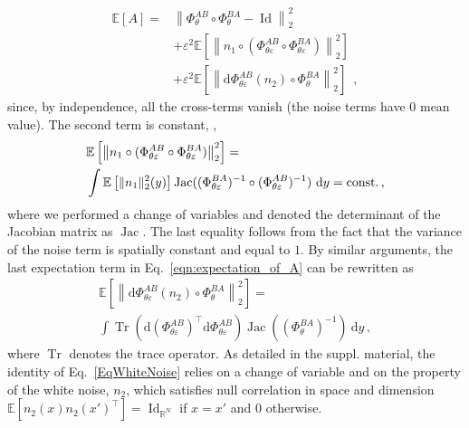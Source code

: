 \documentclass[10pt,twocolumn,letterpaper]{article} %
\newcommand{\fxpsi}{\Phi_{\theta}^{BA}}
\newcommand{\fxvarphi}{\Phi_{\theta}^{AB}}
\newcommand{\fxpsivarepsilon}{\Phi_{\theta \varepsilon}^{BA}}
\newcommand{\fxvarphivarepsilon}{\Phi_{\theta \varepsilon}^{AB}}
\begin{document}
\begin{equation}
  \begin{split}
   \mathbb{E}[A] = & \left\| \fxvarphi \circ \fxpsi - \operatorname{Id} \right\|^2_2  \\
   & + \varepsilon^2 \mathbb{E}\left[\left\|n_1\circ(\fxvarphivarepsilon \circ \fxpsivarepsilon)\right\|^2_2\right] \\ 
   & + \varepsilon^2\mathbb{E}\left[\left\|\mathrm{d}\fxvarphivarepsilon( n_2) \circ \fxpsi \right\|^2_2\right]\enspace,
  \end{split}
  \label{eqn:expectation_of_A}
\end{equation}
since, by independence, all the cross-terms vanish (the noise terms have $0$ mean value).
The second term is constant, \ie,
\begin{alignat}{1}
  &\mathbb{E}\left[\left\|n_1\circ(\fxvarphivarepsilon \circ \fxpsivarepsilon)\right\|^2_2\right] =
  \\
  &\int \mathbb{E}\left[\|n_1\|^2_2(y)\right] \operatorname{Jac}((\fxpsivarepsilon)^{-1} \circ (\fxvarphivarepsilon)^{-1})~\mathrm{d}y= \text{const.} \,, \notag
\end{alignat}
where we performed a change of variables and denoted the determinant of the Jacobian matrix as $\operatorname{Jac}$. The last equality follows from the fact that the variance of the noise term is spatially constant and equal to $1$. %
By similar arguments, the last expectation term in Eq.~\eqref{eqn:expectation_of_A} can be rewritten as
\begin{multline}\label{EqWhiteNoise}
  \mathbb{E}\left[\left\|\mathrm{d}\fxvarphivarepsilon( n_2) \circ \fxpsi \right\|^2_2\right] = \\ %
   \int \operatorname{Tr}(\mathrm{d}(\fxvarphivarepsilon)^{\top} \mathrm{d}\fxvarphivarepsilon) \operatorname{Jac}((\fxpsi)^{-1})~\mathrm{d}y\,,
\end{multline}
where $\operatorname{Tr}$ denotes the trace operator. As detailed in the suppl. material, the identity of Eq.~\eqref{EqWhiteNoise} relies on a change of variable and on the property of the white noise, $n_2$, which satisfies null correlation in space and dimension $\mathbb{E}[n_2(x) n_2(x')^\top] = \operatorname{Id}_{\mathbb{R}^N}$ if $x=x'$ and $0$ otherwise.
\end{document}
